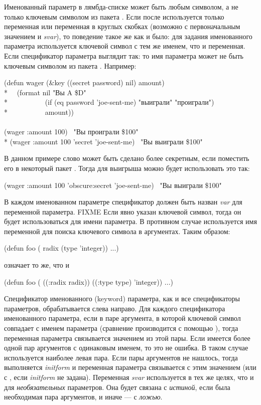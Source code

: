 Именованный параметр в лямбда-списке может быть любым символом, а не только
ключевым символом из пакета . Если после  используется
только переменная или переменная в круглых скобках (возможно с первоначальным
значением и \emph{svar}), то поведение такое же как и было: для задания
именованного параметра используется ключевой символ с тем же именем, что и
переменная. Если спецификатор параметра выглядит так:  то имя параметра может не быть ключевым символом из пакета
.
Например:
\begin{lisp}
(defun wager (\&key ((secret password) nil) amount) \\*
~~(format nil "Вы {\Xtilde}A \${\Xtilde}D" \\*
~~~~~~~~~~(if (eq password 'joe-sent-me) "выиграли" "проиграли") \\*
~~~~~~~~~~amount)) \\
\\
(wager :amount 100) \EV\ "Вы проиграли \$100" \\*
(wager :amount 100 'secret 'joe-sent-me) \EV\ "Вы выиграли \$100"
\end{lisp}
В данном примере слово  может быть сделано более секретным, если
поместить его в некоторый пакет . Тогда для выигрыша можно будет
использовать это так:
\begin{lisp}
(wager :amount 100 'obscure:secret 'joe-sent-me) \EV\ "Вы выиграли \$100"
\end{lisp}

В каждом именованном параметре спецификатор должен быть назван \emph{var} для
переменной параметра. FIXME
Если явно указан ключевой символ, тогда он будет использоваться для имени
параметра. В противном случае используется имя переменной  для поиска
ключевого символа в аргументах. Таким образом:
\begin{lisp}
(defun foo ( radix (type 'integer)) ...)
\end{lisp}
означает то же, что и
\begin{lisp}
(defun foo ( ((:radix radix)) ((:type type) 'integer)) ...)
\end{lisp}

Спецификатор именованного (keyword) параметра, как и все спецификаторы
параметров, обрабатывается слева направо.
Для каждого спецификатора именованного параметра, если в паре аргумента, в
которой ключевой символ совпадает с именем параметра (сравнение производится с
помощью ), тогда переменная параметра связывается значением из этой
пары.
Если имеется более одной пар аргументов с одинаковым именем, то это не ошибка. В
таком случае используется наиболее левая пара.
Если пары аргументов не нашлось, тогда выполняется \emph{initform} и
переменная параметра связывается с этим значением (или с {\false}, если
\emph{initform} не задана). Переменная \emph{svar} используется в тех же
целях, что и для \emph{необязательных} параметров. Она будет связана с
\emph{истиной}, если была необходимая пара аргументов, и иначе --- с \emph{ложью}.

